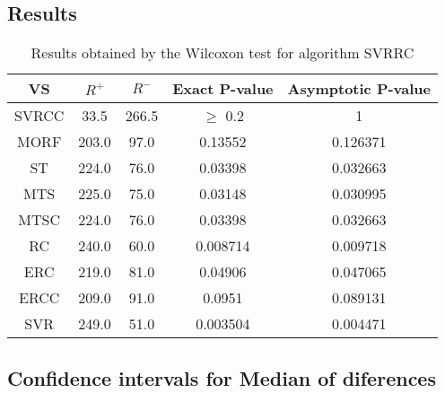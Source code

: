 \documentclass[a4paper,10pt]{article}
\begin{document}
\subsection{Results}

\begin{table}[!htp]
\centering\small
\begin{tabular}{
|c|c|c|c|c|}
\hline
 VS & $R^{+}$ & $R^{-}$ & Exact P-value & Asymptotic P-value \\ \hline 
SVRCC & 33.5 & 266.5 & $\geq$ 0.2 & 1\\ \hline 
MORF & 203.0 & 97.0 & 0.13552 & 0.126371\\ \hline 
ST & 224.0 & 76.0 & 0.03398 & 0.032663\\ \hline 
MTS & 225.0 & 75.0 & 0.03148 & 0.030995\\ \hline 
MTSC & 224.0 & 76.0 & 0.03398 & 0.032663\\ \hline 
RC & 240.0 & 60.0 & 0.008714 & 0.009718\\ \hline 
ERC & 219.0 & 81.0 & 0.04906 & 0.047065\\ \hline 
ERCC & 209.0 & 91.0 & 0.0951 & 0.089131\\ \hline 
SVR & 249.0 & 51.0 & 0.003504 & 0.004471\\ \hline 

\end{tabular}
\caption{Results obtained by the Wilcoxon test for algorithm SVRRC}
\end{table}

\subsection{Confidence intervals for Median of diferences}
\end{document}
